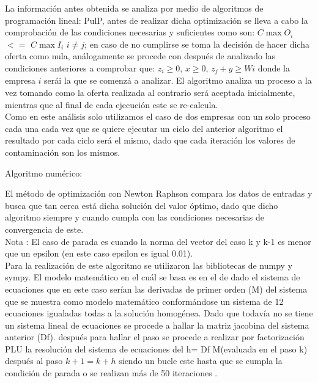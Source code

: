 \documentclass{article}
\begin{document}
  La informaci\'on antes obtenida se analiza por medio de algoritmos de programaci\'on lineal: PulP, antes de 
  realizar dicha optimizaci\'on se lleva a cabo la comprobaci\'on de las condiciones necesarias y suficientes como
   son:  $ C\max{O_{i }} $ $<=$  $ C\max{I_{i}}$ ${i \neq j}$; 
 en caso de no cumplirse se toma la decisi\'on de hacer dicha oferta como nula, an\'alogamente se procede
  con despu\'es de
analizado las condiciones anteriores a comprobar que:  $z_i \geq 0$, $x\geq 0$,
$z_j + y \geq W{i}$ donde la empresa $ i$ ser\'ai la que se comenz\'a a analizar. El algoritmo analiza un
 proceso a la vez tomando como la oferta realizada al contrario será aceptada inicialmente, mientras que al final de 
 cada ejecución este se re-calcula.\\
  Como en este análisis solo utilizamos el caso de dos empresas
 con un solo proceso cada una cada vez que se quiere ejecutar un ciclo del anterior algoritmo el resultado por cada ciclo será el mismo, dado 
 que cada iteración los valores de contaminación son los mismos.
 
 \vspace{1.0cm}
 \begin{center}
 {\Large Algoritmo numérico:}
 \end{center}
 El método de optimización con Newton Raphson compara los datos de entradas y busca que tan cerca está dicha solución del valor 
 óptimo, dado que dicho algoritmo siempre y cuando cumpla con las condiciones necesarias de convergencia de este.\\

 Nota : El caso de parada es cuando la norma del vector del caso k y k-1 es menor que un epsilon (en este caso epsilon es igual 0.01).\\
 
 Para la realización de este algoritmo se utilizaron las bibliotecas de numpy y sympy. 
 El modelo matemático en el cuál se basa es en el de dado el sistema de ecuaciones que en este caso serían las derivadas de primer orden (M) del sistema que se muestra como modelo matemático
 conformándose un sistema de 12 ecuaciones igualadas todas a la solución homogénea. Dado que todavía no se tiene un sistema lineal de ecuaciones 
 se procede a hallar la matriz jacobina del sistema anterior (Df). después para hallar el paso se procede a realizar 
 por factorización PLU la resolución del sistema de ecuaciones del h=  Df M(evaluada en el paso k)
 después al paso $k+1$$=$$k+h$ siendo un bucle este hasta que se cumpla la condición de parada o 
 se realizan más de 50 iteraciones
 .
\end{document}
